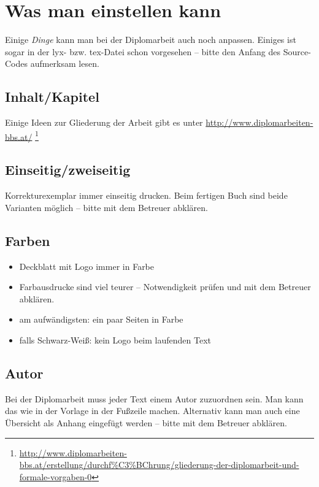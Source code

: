 \section{Was man einstellen kann}\label{was-man-einstellen-kann}

Einige \emph{Dinge} kann man bei der Diplomarbeit auch noch anpassen.
Einiges ist sogar in der lyx- bzw. tex-Datei schon vorgesehen -- bitte
den Anfang des Source-Codes aufmerksam lesen.

\subsection{Inhalt/Kapitel}\label{inhaltkapitel}

Einige Ideen zur Gliederung der Arbeit gibt es unter
\url{http://www.diplomarbeiten-bbs.at/} \footnote{\url{http://www.diplomarbeiten-bbs.at/erstellung/durchf\%C3\%BChrung/gliederung-der-diplomarbeit-und-formale-vorgaben-0}}

\subsection{Einseitig/zweiseitig}\label{einseitigzweiseitig}

Korrekturexemplar immer einseitig drucken. Beim fertigen Buch sind beide
Varianten möglich -- bitte mit dem Betreuer abklären.

\subsection{Farben}\label{farben}

\begin{itemize}
\tightlist
\item
  Deckblatt mit Logo immer in Farbe
\item
  Farbausdrucke sind viel teurer -- Notwendigkeit prüfen und mit dem
  Betreuer abklären.
\item
  am aufwändigsten: ein paar Seiten in Farbe
\item
  falls Schwarz-Weiß: kein Logo beim laufenden Text
\end{itemize}

\subsection{Autor}\label{autor}

Bei der Diplomarbeit muss jeder Text einem Autor zuzuordnen sein. Man
kann das wie in der Vorlage in der Fußzeile machen. Alternativ kann man
auch eine Übersicht als Anhang eingefügt werden -- bitte mit dem
Betreuer abklären.

